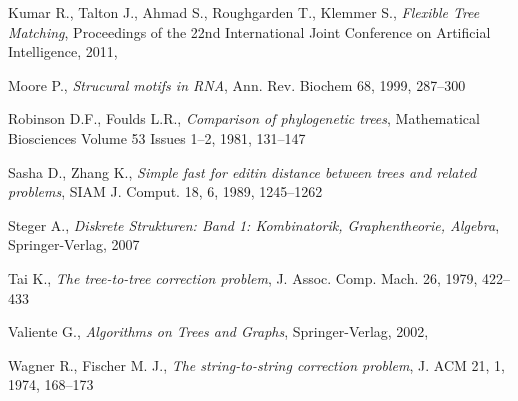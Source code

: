 \begin{thebibliography}{99}
  Kumar R., Talton J., Ahmad S., Roughgarden T., Klemmer S.,
  \textit{Flexible Tree Matching},
  Proceedings of the 22nd International Joint Conference on Artificial Intelligence,
  2011,
  
  Moore P.,
  \textit{Strucural motifs in RNA},
  Ann. Rev. Biochem 68,
  1999,
  287--300
  
  Robinson D.F., Foulds L.R.,
  \textit{Comparison of phylogenetic trees},
  Mathematical Biosciences Volume 53 Issues 1–2,
  1981,
  131--147
  
  Sasha D., Zhang K.,
  \textit{Simple fast for editin distance between trees and related problems},
  SIAM J. Comput. 18, 6,
  1989,
  1245--1262
  
  Steger A.,
  \textit{Diskrete Strukturen: Band 1: Kombinatorik, Graphentheorie, Algebra},
  Springer-Verlag,
  2007
  
  Tai K.,
  \textit{The tree-to-tree correction problem},
  J. Assoc. Comp. Mach. 26,
  1979,
  422--433
  
  Valiente G.,
  \textit{Algorithms on Trees and Graphs},
  Springer-Verlag,
  2002,
  
  Wagner R., Fischer M. J.,
  \textit{The string-to-string correction problem},
  J. ACM 21, 1,
  1974,
  168--173
  
\end{thebibliography}